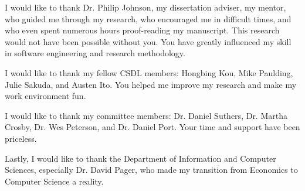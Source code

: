 \begin{acknowledgments} %

I would like to thank Dr. Philip Johnson, my dissertation adviser, my mentor, who guided me through my research, who encouraged me in difficult times, and who even spent numerous hours proof-reading my manuscript. This research would not have been possible without you. You have greatly influenced my skill in software engineering and research methodology.

I would like to thank my fellow CSDL members: Hongbing Kou, Mike Paulding, Julie Sakuda, and Austen Ito. You helped me improve my research and make my work environment fun.

I would like to thank my committee members: Dr. Daniel Suthers, Dr. Martha Crosby, Dr. Wes Peterson, and Dr. Daniel Port. Your time and support have been priceless.

Lastly, I would like to thank the Department of Information and Computer Sciences, especially Dr. David Pager, who made my transition from Economics to Computer Science a reality.

\end{acknowledgments} %


